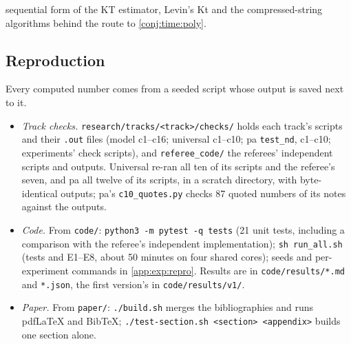 sequential form of the KT estimator, Levin's Kt and the compressed-string algorithms behind the route to \cref{conj:time:poly}.

\subsection{Reproduction}\label{app:ver:repro}

Every computed number comes from a seeded script whose output is saved next to it.
\begin{itemize}[leftmargin=*]
\item \emph{Track checks.} \texttt{research/tracks/<track>/checks/} holds each track's scripts and their \texttt{.out} files (model c1--c16; universal c1--c10; pa \texttt{test\_nd}, c1--c10; experiments' check scripts), and \texttt{referee\_code/} the referees' independent scripts and outputs. Universal re-ran all ten of its scripts and the referee's seven, and pa all twelve of its scripts, in a scratch directory, with byte-identical outputs; pa's \texttt{c10\_quotes.py} checks 87 quoted numbers of its notes against the outputs.
\item \emph{Code.} From \texttt{code/}: \texttt{python3 -m pytest -q tests} (21 unit tests, including a comparison with the referee's independent implementation); \texttt{sh run\_all.sh} (tests and E1--E8, about 50 minutes on four shared cores); seeds and per-experiment commands in \cref{app:exp:repro}. Results are in \texttt{code/results/*.md} and \texttt{*.json}, the first version's in \texttt{code/results/v1/}.
\item \emph{Paper.} From \texttt{paper/}: \texttt{./build.sh} merges the bibliographies and runs pdf\LaTeX{} and Bib\TeX; \texttt{./test-section.sh <section> <appendix>} builds one section alone.
\end{itemize}
